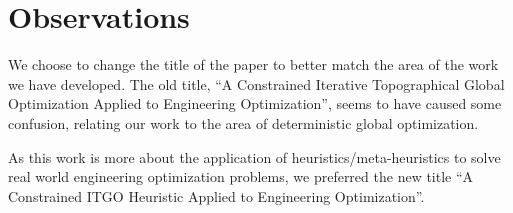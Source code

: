 
\section*{Observations}

We choose to change the title of the paper to better match the area of the work we have developed. The old title, ``A Constrained Iterative Topographical Global Optimization Applied to Engineering Optimization'', seems to have caused some confusion, relating our work to the area of deterministic global optimization.

As this work is more about the application of heuristics/meta-heuristics to solve real world engineering optimization problems, we preferred the new title ``A Constrained ITGO Heuristic Applied to Engineering Optimization''.
